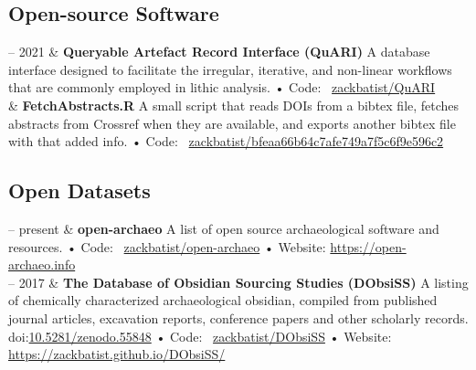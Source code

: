 \documentclass[11pt, a4paper]{article}
\newcommand{\LastName}{Batist}
\newcommand{\Initials}{Z}
\newcommand{\Me}{\LastName, \Initials}  %
\newcommand{\DOI}[1]{doi:\href{https://doi.org/#1}{#1}}
\newcommand{\GitHub}[1]{\newline • Code: \faGithub\ \href{https://github.com/#1}{#1}}
\newcommand{\Gist}[1]{\newline • Code: \faGithub\ \href{https://gist.github.com/#1}{#1}}
\newcommand{\Website}[1]{\newline • Website: \href{https://#1}{#1}}
\newcommand{\Duration}[2]{\fontsize{10pt}{0}\selectfont #1 -- #2}
\newcommand{\Year}[1]{\fontsize{10pt}{0}\selectfont #1}
\newcommand{\Ongoing}{present}
\begin{document}

\subsection{Open-source Software}

\begin{EntriesTable}
  \Duration{2020}{2021} &
  \textbf{Queryable Artefact Record Interface (QuARI)}
  \newline
  A database interface designed to facilitate the irregular, iterative, and non-linear workflows that are commonly employed in lithic analysis.
  \GitHub{zackbatist/QuARI}
  \\
  \Year{2018} &
  \textbf{FetchAbstracts.R}
  \newline
  A small script that reads DOIs from a bibtex file, fetches abstracts from Crossref when they are available, and exports another bibtex file with that added info.
  \Gist{zackbatist/bfeaa66b64c7afe749a7f5c6f9e596c2}
  \\

\end{EntriesTable}

\subsection{Open Datasets}

\begin{EntriesTable}
\Duration{2018}{\Ongoing}  &
  \textbf{open-archaeo}
  A list of open source archaeological software and resources.
  \GitHub{zackbatist/open-archaeo}
  \Website{https://open-archaeo.info}
  \\
\Duration{2014}{2017}  &
  \textbf{The Database of Obsidian Sourcing Studies (DObsiSS)}
  A listing of chemically characterized archaeological obsidian, compiled from published journal articles, excavation reports, conference papers and other scholarly records.
  \DOI{10.5281/zenodo.55848}
  \GitHub{zackbatist/DObsiSS}
  \Website{https://zackbatist.github.io/DObsiSS/}
  \\

  \end{EntriesTable}
\end{document}

